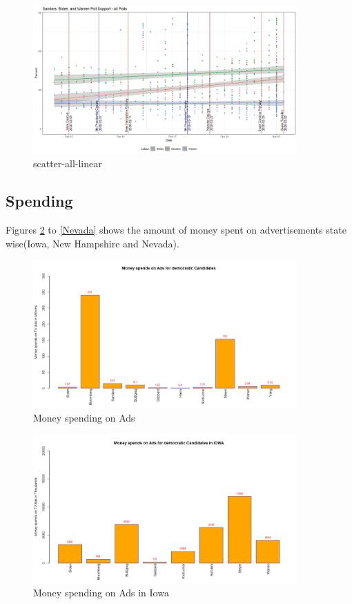 \begin{figure}[H]
    \centering
    \includegraphics[width=0.9\textwidth]{figures/scatter-all-linear.png}
    \caption{scatter-all-linear}
    \label{scatter-all-linear}
\end{figure}

\subsection{Spending}
Figures \ref{MoneyspendinAds} to \ref{Nevada} shows the amount of money spent on advertisements state wise(Iowa, New Hampshire and Nevada). 

\begin{figure}[H]
    \centering
    \includegraphics[width=0.9\textwidth]{figures/MoneyspendinAds.png}
    \caption{Money spending on Ads}
    \label{MoneyspendinAds}
\end{figure}

\begin{figure}[H]
    \centering
    \includegraphics[width=0.9\textwidth]{figures/IOWA.png}
    \caption{Money spending on Ads in Iowa}
    \label{IOWA}
\end{figure}

